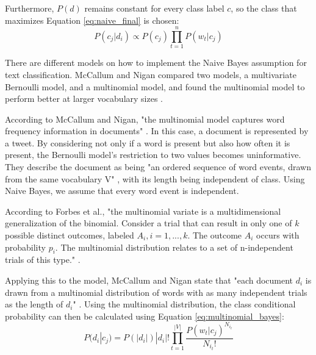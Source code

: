         Furthermore, $P(d)$ remains constant for every class label $c$, so the class that maximizes Equation \eqref{eq:naive_final} is chosen: 
        \begin{equation}
            \label{eq:naive_final}
            P(c_j|d_i)\propto P(c_j)\prod_{t=1}^{n}P(w_{t}|c_j) 
        \end{equation}   
        
        
        There are different models on how to implement the Naive Bayes assumption for text classification. McCallum and Nigan compared two models, a multivariate Bernoulli model, and a multinomial model, and found the multinomial model to perform better at larger vocabulary sizes \cite{Mccallum1998}.
        
        According to McCallum and Nigan, "the multinomial model captures word frequency information in documents" \cite[p.~3]{Mccallum1998}. In this case, a document is represented by a tweet. By considering not only if a word is present but also how often it is present, the Bernoulli model's restriction to two values becomes uninformative. They describe the document as being "an ordered sequence of word events, drawn from the same vocabulary V" \cite[p.~3]{Mccallum1998}, with its length being independent of class. Using Naive Bayes, we assume that every word event is independent.
        
        
        According to Forbes et al., "the multinomial variate is a multidimensional generalization of the binomial. Consider a trial that can result in only one of $k$ possible distinct outcomes, labeled $A_i, i = 1,...,k$. The outcome $A_i$ occurs with probability $p_i$. The multinomial distribution relates to a set of n-independent trials of this type." \cite[p.~135]{evans2011statistical}.
        
        Applying this to the model, McCallum and Nigan state that "each document $d_i$ is drawn from a multinomial distribution of words with as many independent trials as the length of $d_i$" \cite[p.~3]{Mccallum1998}. Using the multinomial distribution, the class conditional probability can then be calculated using Equation \eqref{eq:multinomial_bayes}:
        \begin{equation}
            \label{eq:multinomial_bayes}
                P(d_i|c_j) = P(|d_i|)|d_i|!\prod_{t=1}^{|V|}\frac{P(w_t|c_j)^{N_{i_t}}}{N_{i_t}!}
        \end{equation}
        
